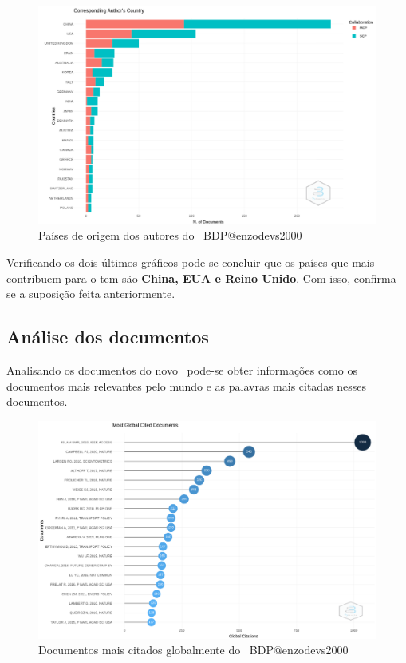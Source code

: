 \begin{figure}[H]
    \centering
    \includegraphics[width=1\textwidth]{experiments/enzodevs2000/AnaliseBibliometrica/BigDataInPolicy/Figures/Graficos/NovoDataset/Authors/authorsCountries.png}
    \caption{Países de origem dos autores do
    \dataset\ BDP@enzodevs2000}
    \label{fig:enzodevs2000:BDP:newdataset:authors:authors_countries}
\end{figure}

Verificando os dois últimos gráficos pode-se concluir que os países que mais contribuem para o tem são \textbf{China, EUA e Reino Unido}. Com isso, confirma-se a suposição feita anteriormente.

\subsection{Análise dos documentos}

Analisando os documentos do novo \dataset\ pode-se obter informações como os documentos mais relevantes pelo mundo e as palavras mais citadas nesses documentos.

\begin{figure}[H]
    \centering
    \includegraphics[width=1\textwidth]{experiments/enzodevs2000/AnaliseBibliometrica/BigDataInPolicy/Figures/Graficos/NovoDataset/Documents/MostCitedDocuments.png}
    \caption{Documentos mais citados globalmente do
    \dataset\ BDP@enzodevs2000}
    \label{fig:enzodevs2000:BDP:newdataset:documents:most_cited_global}
\end{figure}

